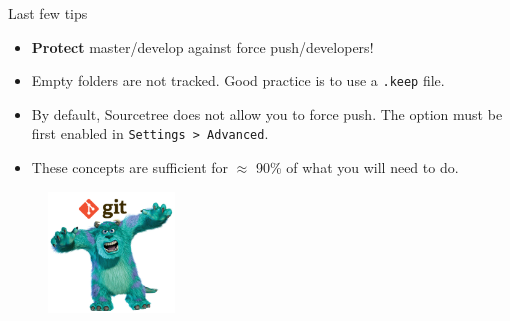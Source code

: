 \documentclass[compress,english,aspectratio=1610]{beamer}
\let\olditem\item
\renewcommand{\item}{\setlength{\itemsep}{\fill}\olditem}
\begin{document}
\begin{frame}{Last few tips}
	\begin{itemize}
		\item \textbf{Protect} master/develop against force push/developers!
		\item Empty folders are not tracked. Good practice is to use a {\tt .keep} file.
        \item By default, Sourcetree does not allow you to force push.
        The option must be first enabled in {\tt Settings > Advanced}.
		\item These concepts are sufficient for $\approx$ 90\% of what you will need to do.
	\end{itemize}
	\begin{figure}
     	\includegraphics[width=0.3\textwidth]{figures/scary.png}
      \end{figure}
\end{frame}
\end{document}

